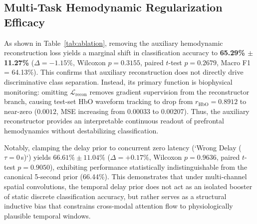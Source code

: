 \documentclass[journal]{IEEEtran}
\begin{document}
\subsection{Multi-Task Hemodynamic Regularization Efficacy}
As shown in Table~\ref{tab:ablation}, removing the auxiliary hemodynamic reconstruction loss yields a marginal shift in classification accuracy to \textbf{65.29\% $\pm$ 11.27\%} ($\Delta = -1.15\%$, Wilcoxon $p = 0.3155$, paired $t$-test $p = 0.2679$, Macro F1 = 64.13\%). This confirms that auxiliary reconstruction does not directly drive discriminative class separation. Instead, its primary function is biophysical monitoring: omitting $\mathcal{L}_{\text{recon}}$ removes gradient supervision from the reconstructor branch, causing test-set HbO waveform tracking to drop from \textbf{$r_{\text{HbO}} = 0.8912$} to near-zero (\textbf{$0.0012$}, MSE increasing from 0.00033 to 0.00207). Thus, the auxiliary reconstructor provides an interpretable continuous readout of prefrontal hemodynamics without destabilizing classification.

Notably, clamping the delay prior to concurrent zero latency (`Wrong Delay ($\tau=0$\,s)`) yields $66.61\% \pm 11.04\%$ ($\Delta = +0.17\%$, Wilcoxon $p = 0.9636$, paired $t$-test $p = 0.9050$), exhibiting performance statistically indistinguishable from the canonical 5-second prior (66.44\%). This demonstrates that under multi-channel spatial convolutions, the temporal delay prior does not act as an isolated booster of static discrete classification accuracy, but rather serves as a structural inductive bias that constrains cross-modal attention flow to physiologically plausible temporal windows.
\end{document}

